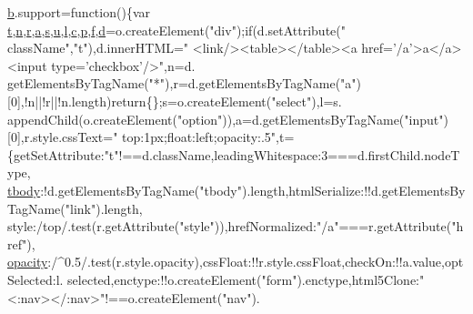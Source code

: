 \begin{DoxyCode}
      \hyperlink{jquery-1_89_81_8min_8js_ac50ac660762310348a84d5558c651020}{b}.support=\textcolor{keyword}{function}()\{var \hyperlink{jquery-1_89_81_8min_8js_a23c5666e83bbbceee94adcd0851f50c4}{t},\hyperlink{root_2static_2root_2js_2bootstrap_2jquery-ui-1_810_84_8custom_8min_8js_afc984c4f6c68ce30a0af99006f5f8d27}{n},\hyperlink{prism_8js_a514f1b439f404f86f77090fa9edc96ce}{r},\hyperlink{root_2static_2root_2js_2bootstrap_2bootstrap_8min_8js_ae8f6b400ed3390908c5cdeebed3a82b9}{a},\hyperlink{jquery-1_89_81_8min_8js_a3691308f2a4c2f6983f2880d32e29c84}{s},\hyperlink{jquery-migrate-1_82_81_8min_8js_accb4ce8dd4113ac0f510653e31809106}{u},\hyperlink{jquery-migrate-1_82_81_8min_8js_ae5e71a2600e8891c54854be157cc6626}{l},\hyperlink{jquery-1_89_81_8min_8js_a3fc7800392ca414b649cfe0282440252}{c},\hyperlink{jquery-migrate-1_82_81_8min_8js_ad1707b001240e9c8298830073364c8bf}{p},\hyperlink{jquery-migrate-1_82_81_8min_8js_a9cf09a2972472098a4c689fd988f4dfc}{f},\hyperlink{root_2static_2root_2js_2bootstrap_2bootstrap_8min_8js_aeb337d295abaddb5ec3cb34cc2e2bbc9}{d}=o.createElement(\textcolor{stringliteral}{"div"});\textcolor{keywordflow}{if}(d.setAttribute(\textcolor{stringliteral}{"
      className"},\textcolor{stringliteral}{"t"}),d.innerHTML=\textcolor{stringliteral}{"  <link/><table></table><a href='/a'>a</a><input type='checkbox'/>"},n=d.
      getElementsByTagName(\textcolor{stringliteral}{"*"}),r=d.getElementsByTagName(\textcolor{stringliteral}{"a"})[0],!n||!r||!n.length)\textcolor{keywordflow}{return}\{\};s=o.createElement(\textcolor{stringliteral}{"select"}),l=s.
      appendChild(o.createElement(\textcolor{stringliteral}{"option"})),a=d.getElementsByTagName(\textcolor{stringliteral}{"input"})[0],r.style.cssText=\textcolor{stringliteral}{"
      top:1px;float:left;opacity:.5"},t=\{getSetAttribute:\textcolor{stringliteral}{"t"}!==d.className,leadingWhitespace:3===d.firstChild.nodeType,
      \hyperlink{jquery-1_89_81_8min_8js_ac84f503a71898213f4c6b5e1dd5c6abd}{tbody}:!d.getElementsByTagName(\textcolor{stringliteral}{"tbody"}).length,htmlSerialize:!!d.getElementsByTagName(\textcolor{stringliteral}{"link"}).length,
      style:/top/.test(r.getAttribute(\textcolor{stringliteral}{"style"})),hrefNormalized:\textcolor{stringliteral}{"/a"}===r.getAttribute(\textcolor{stringliteral}{"href"}),
      \hyperlink{jquery-1_89_81_8min_8js_aa7fd47fba13ed7cd4296aa7cb5fa4aed}{opacity}:/^0.5/.test(r.style.opacity),cssFloat:!!r.style.cssFloat,checkOn:!!a.value,optSelected:l.
      selected,enctype:!!o.createElement(\textcolor{stringliteral}{"form"}).enctype,html5Clone:\textcolor{stringliteral}{"<:nav></:nav>"}!==o.createElement(\textcolor{stringliteral}{"nav"}).

\end{DoxyCode}
